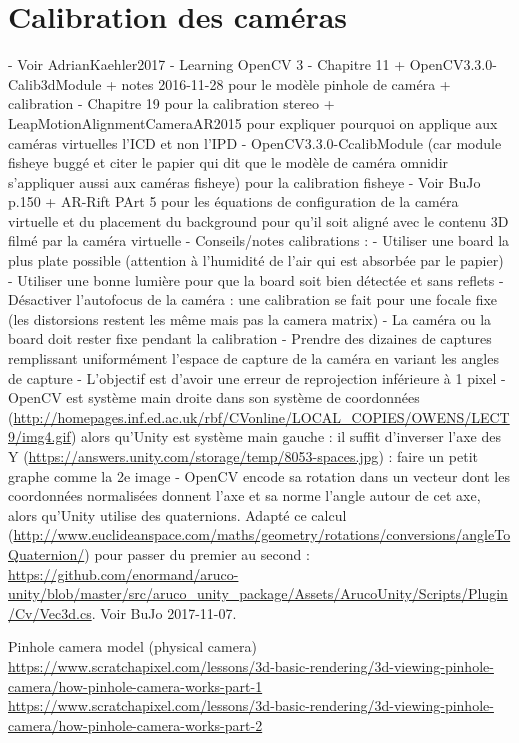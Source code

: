 \section{Calibration des caméras}
- Voir AdrianKaehler2017 - Learning OpenCV 3
  - Chapitre 11 + OpenCV3.3.0-Calib3dModule + notes 2016-11-28 pour le modèle pinhole de caméra + calibration
  - Chapitre 19 pour la calibration stereo + LeapMotionAlignmentCameraAR2015 pour expliquer pourquoi on applique aux caméras virtuelles l'ICD et non l'IPD
  - OpenCV3.3.0-CcalibModule (car module fisheye buggé et citer le papier qui dit que le modèle de caméra omnidir s'appliquer aussi aux caméras fisheye) pour la calibration fisheye
- Voir BuJo p.150 + AR-Rift PArt 5 pour les équations de configuration de la caméra virtuelle et du placement du background pour qu'il soit aligné avec le contenu 3D filmé par la caméra virtuelle
- Conseils/notes calibrations :
  - Utiliser une board la plus plate possible (attention à l'humidité de l'air qui est absorbée par le papier)
  - Utiliser une bonne lumière pour que la board soit bien détectée et sans reflets
  - Désactiver l'autofocus de la caméra : une calibration se fait pour une focale fixe (les distorsions restent les même mais pas la camera matrix)
  - La caméra ou la board doit rester fixe pendant la calibration
  - Prendre des dizaines de captures remplissant uniformément l'espace de capture de la caméra en variant les angles de capture
  - L'objectif est d'avoir une erreur de reprojection inférieure à 1 pixel
  - OpenCV est système main droite dans son système de coordonnées (\url{http://homepages.inf.ed.ac.uk/rbf/CVonline/LOCAL_COPIES/OWENS/LECT9/img4.gif}) alors qu'Unity est système main gauche : il suffit d'inverser l'axe des Y (\url{https://answers.unity.com/storage/temp/8053-spaces.jpg}) : faire un petit graphe comme la 2e image
  - OpenCV encode sa rotation dans un vecteur dont les coordonnées normalisées donnent l'axe et sa norme l'angle autour de cet axe, alors qu'Unity utilise des quaternions. Adapté ce calcul (\url{http://www.euclideanspace.com/maths/geometry/rotations/conversions/angleToQuaternion/}) pour passer du premier au second : \url{https://github.com/enormand/aruco-unity/blob/master/src/aruco_unity_package/Assets/ArucoUnity/Scripts/Plugin/Cv/Vec3d.cs}. Voir BuJo 2017-11-07.

Pinhole camera model (physical camera)\\
\url{https://www.scratchapixel.com/lessons/3d-basic-rendering/3d-viewing-pinhole-camera/how-pinhole-camera-works-part-1}\\
\url{https://www.scratchapixel.com/lessons/3d-basic-rendering/3d-viewing-pinhole-camera/how-pinhole-camera-works-part-2}

